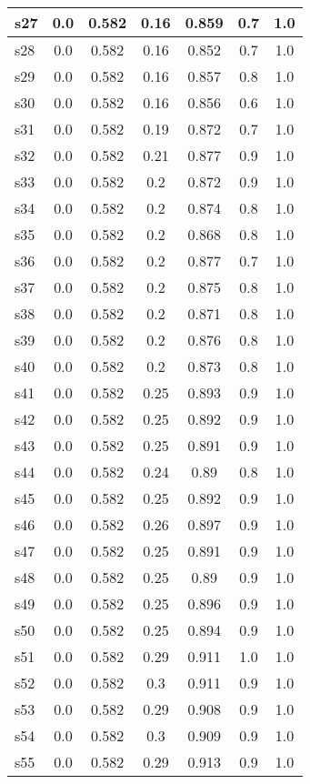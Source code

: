 \documentclass{article}
\begin{document}
\begin{tabular}{|l|c|c|c|c|c|c|}
\hline
s27 &0.0 & 0.582 & 0.16 & 0.859 & 0.7 & 1.0\\
\hline
s28 &0.0 & 0.582 & 0.16 & 0.852 & 0.7 & 1.0\\
\hline
s29 &0.0 & 0.582 & 0.16 & 0.857 & 0.8 & 1.0\\
\hline
s30 &0.0 & 0.582 & 0.16 & 0.856 & 0.6 & 1.0\\
\hline
s31 &0.0 & 0.582 & 0.19 & 0.872 & 0.7 & 1.0\\
\hline
s32 &0.0 & 0.582 & 0.21 & 0.877 & 0.9 & 1.0\\
\hline
s33 &0.0 & 0.582 & 0.2 & 0.872 & 0.9 & 1.0\\
\hline
s34 &0.0 & 0.582 & 0.2 & 0.874 & 0.8 & 1.0\\
\hline
s35 &0.0 & 0.582 & 0.2 & 0.868 & 0.8 & 1.0\\
\hline
s36 &0.0 & 0.582 & 0.2 & 0.877 & 0.7 & 1.0\\
\hline
s37 &0.0 & 0.582 & 0.2 & 0.875 & 0.8 & 1.0\\
\hline
s38 &0.0 & 0.582 & 0.2 & 0.871 & 0.8 & 1.0\\
\hline
s39 &0.0 & 0.582 & 0.2 & 0.876 & 0.8 & 1.0\\
\hline
s40 &0.0 & 0.582 & 0.2 & 0.873 & 0.8 & 1.0\\
\hline
s41 &0.0 & 0.582 & 0.25 & 0.893 & 0.9 & 1.0\\
\hline
s42 &0.0 & 0.582 & 0.25 & 0.892 & 0.9 & 1.0\\
\hline
s43 &0.0 & 0.582 & 0.25 & 0.891 & 0.9 & 1.0\\
\hline
s44 &0.0 & 0.582 & 0.24 & 0.89 & 0.8 & 1.0\\
\hline
s45 &0.0 & 0.582 & 0.25 & 0.892 & 0.9 & 1.0\\
\hline
s46 &0.0 & 0.582 & 0.26 & 0.897 & 0.9 & 1.0\\
\hline
s47 &0.0 & 0.582 & 0.25 & 0.891 & 0.9 & 1.0\\
\hline
s48 &0.0 & 0.582 & 0.25 & 0.89 & 0.9 & 1.0\\
\hline
s49 &0.0 & 0.582 & 0.25 & 0.896 & 0.9 & 1.0\\
\hline
s50 &0.0 & 0.582 & 0.25 & 0.894 & 0.9 & 1.0\\
\hline
s51 &0.0 & 0.582 & 0.29 & 0.911 & 1.0 & 1.0\\
\hline
s52 &0.0 & 0.582 & 0.3 & 0.911 & 0.9 & 1.0\\
\hline
s53 &0.0 & 0.582 & 0.29 & 0.908 & 0.9 & 1.0\\
\hline
s54 &0.0 & 0.582 & 0.3 & 0.909 & 0.9 & 1.0\\
\hline
s55 &0.0 & 0.582 & 0.29 & 0.913 & 0.9 & 1.0\\

\end{tabular}
\end{document}
